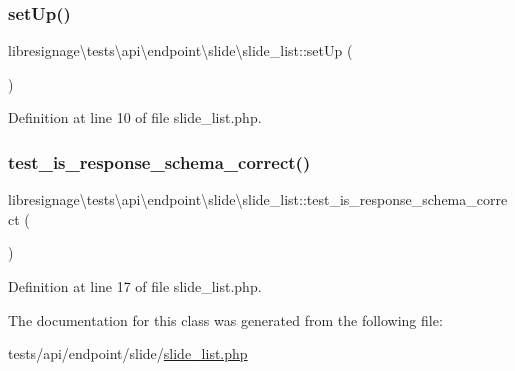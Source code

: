 \subsubsection{\texorpdfstring{set\+Up()}{setUp()}}
{\footnotesize\ttfamily libresignage\textbackslash{}tests\textbackslash{}api\textbackslash{}endpoint\textbackslash{}slide\textbackslash{}slide\+\_\+list\+::set\+Up (\begin{DoxyParamCaption}{ }\end{DoxyParamCaption})}



Definition at line 10 of file slide\+\_\+list.\+php.

\mbox{\label{classlibresignage_1_1tests_1_1api_1_1endpoint_1_1slide_1_1slide__list_a533866ceff6044d251aa8a5e4aa9bd41}} 
\subsubsection{\texorpdfstring{test\+\_\+is\+\_\+response\+\_\+schema\+\_\+correct()}{test\_is\_response\_schema\_correct()}}
{\footnotesize\ttfamily libresignage\textbackslash{}tests\textbackslash{}api\textbackslash{}endpoint\textbackslash{}slide\textbackslash{}slide\+\_\+list\+::test\+\_\+is\+\_\+response\+\_\+schema\+\_\+correct (\begin{DoxyParamCaption}{ }\end{DoxyParamCaption})}



Definition at line 17 of file slide\+\_\+list.\+php.



The documentation for this class was generated from the following file\+:\begin{DoxyCompactItemize}
\item 
tests/api/endpoint/slide/\hyperlink{tests_2api_2endpoint_2slide_2slide__list_8php}{slide\+\_\+list.\+php}\end{DoxyCompactItemize}
